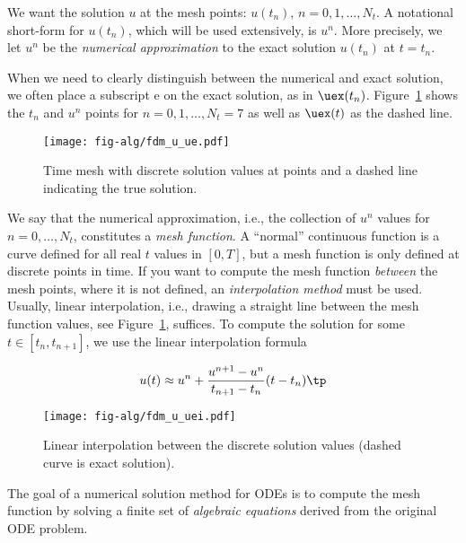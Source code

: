 \documentclass[graybox,sectrefs,envcountresetchap,open=right,final]{svmonodo}
\newenvironment{notice_mdfboxadmon}[1][]{
\begin{notice_mdfboxmdframed}[frametitle=#1]
}
{
\end{notice_mdfboxmdframed}
}
\begin{document}

We want the solution $u$ at the mesh points:
$u(t_n)$, $n=0,1,\ldots,N_t$.
A notational short-form for $u(t_n)$,
which will be used extensively, is $u^{n}$. More precisely, we let
$u^n$ be the \emph{numerical approximation} to the exact solution $u(t_n)$
at $t=t_n$.

When we need to clearly distinguish between the numerical and exact solution,
we often place a subscript e on the exact solution, as in $\uex(t_n)$.
Figure~\ref{decay:fdu:e} shows the $t_n$ and $u^n$ points for $n=0,1,\ldots,N_t=7$ as well as $\uex(t)$ as the dashed line.

\begin{figure}[!ht]  %
  \centerline{\texttt{[image: fig-alg/fdm\_u\_ue.pdf]}}
  \caption{
  Time mesh with discrete solution values at points and a dashed line indicating the true solution. \label{decay:fdu:e}
  }
\end{figure}

We say that the numerical approximation, i.e.,
the collection of $u^n$ values for $n=0,\ldots,N_t$,
constitutes a \emph{mesh function}.
A ``normal'' continuous function is a curve defined for all real $t$
values in $[0,T]$, but a mesh function is only defined at discrete
points in time. If you want to compute the mesh function \emph{between} the
mesh points, where it is not defined, an \emph{interpolation method} must be
used. Usually, linear interpolation, i.e., drawing a straight line between
the mesh function values, see Figure~\ref{decay:fdu:e}, suffices.
To compute the solution for some $t\in [t_n, t_{n+1}]$, we use the
linear interpolation formula

\begin{equation}
u(t) \approx u^n + \frac{u^{n+1}-u^n}{t_{n+1}-t_n}(t - t_n)\tp
\end{equation}

\begin{figure}[!ht]  %
  \centerline{\texttt{[image: fig-alg/fdm\_u\_uei.pdf]}}
  \caption{
  Linear interpolation between the discrete solution values (dashed curve is exact solution). \label{decay:fdu:ei}
  }
\end{figure}

\clearpage


\begin{notice_mdfboxadmon}[Notice]
The goal of a numerical solution method for ODEs is
to compute the mesh function by solving a finite set of
\emph{algebraic equations} derived from the original ODE problem.
\end{notice_mdfboxadmon} %
\end{document}
